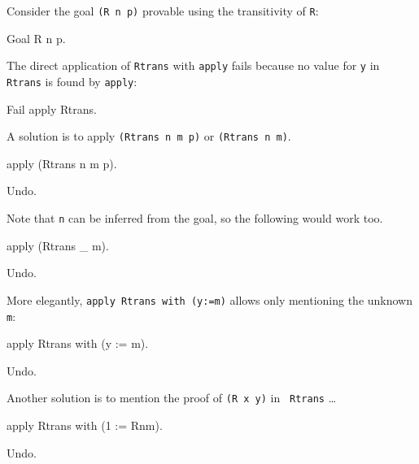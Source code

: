 Consider the goal {\tt (R n p)} provable using the transitivity of
{\tt R}:

\begin{coq_example*}
Goal R n p.
\end{coq_example*}

The direct application of {\tt Rtrans} with {\tt apply} fails because
no value for {\tt y} in {\tt Rtrans} is found by {\tt apply}:

\begin{coq_example}
Fail apply Rtrans.
\end{coq_example}

A solution is to apply {\tt (Rtrans n m p)} or {\tt (Rtrans n m)}.

\begin{coq_example}
apply (Rtrans n m p).
\end{coq_example}

\begin{coq_eval}
Undo.
\end{coq_eval}

Note that {\tt n} can be inferred from the goal, so the following would
work too.

\begin{coq_example*}
apply (Rtrans _ m).
\end{coq_example*}
\begin{coq_eval}
Undo.
\end{coq_eval}

More elegantly, {\tt apply Rtrans with (y:=m)} allows only mentioning
the unknown {\tt m}:

\begin{coq_example*}
apply Rtrans with (y := m).
\end{coq_example*}
\begin{coq_eval}
Undo.
\end{coq_eval}

Another solution is to mention the proof of {\tt (R x y)} in {\tt
Rtrans} \ldots

\begin{coq_example}
apply Rtrans with (1 := Rnm).
\end{coq_example}
\begin{coq_eval}
Undo.
\end{coq_eval}

